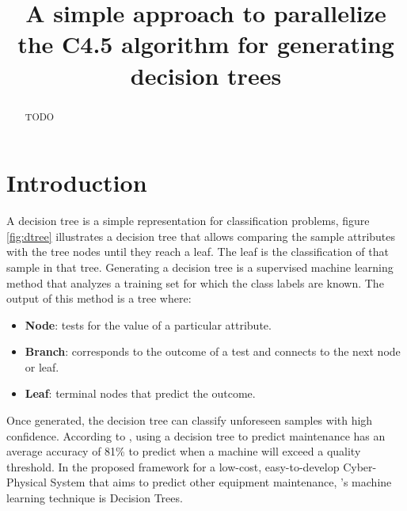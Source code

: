 \documentclass[conference]{IEEEtran}
\begin{document}
\title{A simple approach to parallelize the C4.5 algorithm for generating decision trees}

\author{
}

\maketitle

\begin{abstract}
TODO
\end{abstract}

\section{Introduction}

A decision tree is a simple representation for classification problems, figure \ref{fig:dtree} illustrates a decision tree that allows comparing the sample attributes with the tree nodes until they reach a leaf. The leaf is the classification of that sample in that tree. Generating a decision tree is a supervised machine learning method that analyzes a training set for which the class labels are known. The output of this method is a tree where:

\begin{itemize}
    \item \textbf{Node}: tests for the value of a particular attribute.
    \item \textbf{Branch}: corresponds to the outcome of a test and connects to the next node or leaf.
    \item \textbf{Leaf}: terminal nodes that predict the outcome.
\end{itemize}

Once generated, the decision tree can classify unforeseen samples with high confidence. According to \cite{sezer}, using a decision tree to predict maintenance has an average accuracy of 81\% to predict when a machine will exceed a quality threshold. In the proposed framework for a low-cost, easy-to-develop Cyber-Physical System that aims to predict other equipment maintenance, \cite{sezer}'s machine learning technique is Decision Trees.
\end{document}
